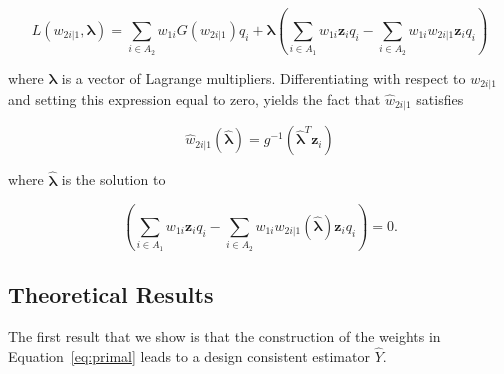 \documentclass[12pt]{article}
\renewcommand{\bf}[1]{\mathbf{#1}}
\begin{document}
\begin{equation}\label{eq:legragedc1}
  L(w_{2i|1}, \bm \lambda) = \sum_{i \in A_2} w_{1i} G(w_{2i|1}) q_i 
  + \bm \lambda \left( \sum_{i \in A_1} w_{1i} \bf z_i q_i -
    \sum_{i \in A_2} w_{1i} w_{2i|1} \bf z_i q_i\right)
\end{equation}

where $\bm \lambda$ is a vector of Lagrange multipliers.
Differentiating with respect to $w_{2i|1}$ and setting this expression equal to
zero, yields the fact that $\hat w_{2i|1}$ satisfies 

$$ \hat w_{2i|1}(\hat{\bm \lambda}) = g^{-1}(\hat{\bm \lambda}^T \bf z_i) $$

where $\hat{\bm \lambda}$ is the solution to

\begin{equation}\label{eq:lamdc1}
  \left( \sum_{i \in A_1} w_{1i} \bf z_i q_i -
  \sum_{i \in A_2} w_{1i} w_{2i|1}(\hat{\bm \lambda}) \bf z_i q_i\right) = 0.
\end{equation}

\subsection{Theoretical Results}

The first result that we show is that the construction of the weights in
Equation~\ref{eq:primal} leads to a design consistent estimator $\hat Y$.
\end{document}
